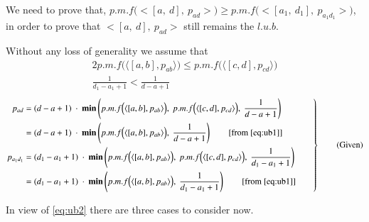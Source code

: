 \documentclass[final,3p, review, times]{util/elsarticle}
\begin{document}
We need to prove that, $p.m.f\Big(\big<[a,\ d],\ p_{ad}\big>\Big)\geq p.m.f\Big(\big<[a_1,\ d_1],\ p_{a_1d_1}\big>\Big)$, in order to prove that $\big<[a,\ d],\ p_{ad}\big>$ still remains the $l.u.b$.

Without any loss of generality we assume that
\begin{alignat}{2}
p.m.f\Big(\langle[a,b],p_{ab}\rangle\Big)\leq p.m.f\Big(\langle[c,d],p_{cd}\rangle\Big)\label{eq:ub1}\\
\frac{1}{d_1-a_1+1}<\frac{1}{d-a+1}\label{eq:ub2}
\end{alignat}
\begin{equation*}
 \left.\begin{aligned}
        p_{ad}&=(d-a+1)\ \cdot\ \mathbf{min}\left(p.m.f\Big(\langle[a,b],p_{ab}\rangle\Big),\ p.m.f\Big(\langle[c,d],p_{cd}\rangle\Big),\ \frac{1}{d-a+1}\right)\\
        &=(d-a+1)\ \cdot\ \mathbf{min}\left(p.m.f\Big(\langle[a,b],p_{ab}\rangle\Big),\ \frac{1}{d-a+1}\right)\qquad[\mathrm{from}\ \ref{eq:ub1}]\\
        p_{a_1d_1}&=(d_1-a_1+1)\ \cdot\ \mathbf{min}\left(p.m.f\Big(\langle[a,b],p_{ab}\rangle\Big),\ p.m.f\Big(\langle[c,d],p_{cd}\rangle\Big),\ \frac{1}{d_1-a_1+1}\right)\\
        &=(d_1-a_1+1)\ \cdot\ \mathbf{min}\left(p.m.f\Big(\langle[a,b],p_{ab}\rangle\Big),\ \frac{1}{d_1-a_1+1}\right)\qquad[\mathrm{from}\ \ref{eq:ub1}]
       \end{aligned}\qquad
 \right\}
 \qquad \text{(Given)}
\end{equation*}

In view of \ref{eq:ub2} there are three cases to consider now.
\end{document}
